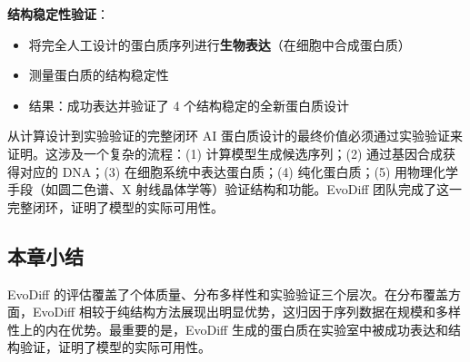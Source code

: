 \textbf{结构稳定性验证}：
\begin{itemize}
    \item 将完全人工设计的蛋白质序列进行\textbf{生物表达}（在细胞中合成蛋白质）
    \item 测量蛋白质的结构稳定性
    \item 结果：成功表达并验证了 4 个结构稳定的全新蛋白质设计
\end{itemize}

\begin{knowledgebox}{从计算设计到实验验证的完整闭环}
AI 蛋白质设计的最终价值必须通过实验验证来证明。这涉及一个复杂的流程：(1) 计算模型生成候选序列；(2) 通过基因合成获得对应的 DNA；(3) 在细胞系统中表达蛋白质；(4) 纯化蛋白质；(5) 用物理化学手段（如圆二色谱、X 射线晶体学等）验证结构和功能。EvoDiff 团队完成了这一完整闭环，证明了模型的实际可用性。
\end{knowledgebox}

\subsection{本章小结}

EvoDiff 的评估覆盖了个体质量、分布多样性和实验验证三个层次。在分布覆盖方面，EvoDiff 相较于纯结构方法展现出明显优势，这归因于序列数据在规模和多样性上的内在优势。最重要的是，EvoDiff 生成的蛋白质在实验室中被成功表达和结构验证，证明了模型的实际可用性。


